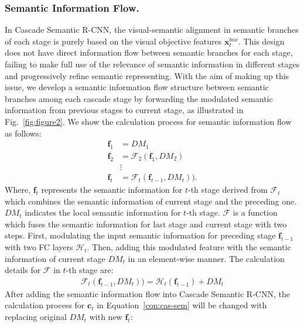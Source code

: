 \documentclass[runningheads]{llncs}
\begin{document}
\subsubsection{Semantic Information Flow.}
In Cascade Semantic R-CNN, the visual-semantic alignment in semantic branches of each stage is purely based on the visual objective features $\mathbf{x}_{t}^{box}$. This design does not have direct information flow between semantic branches for each stage, failing to make full use of the relevance of semantic information in different stages and progressively refine semantic representing. With the aim of making up this issue, we develop a semantic information flow structure between semantic branches among each cascade stage by forwarding the modulated semantic information from previous stages to current stage, as illustrated in Fig.~\ref{fig:figure2}. We show the calculation process for semantic information flow as follows:
\begin{equation}
\begin{split}
    \mathbf{f}_{1} &= DM_{1} \\
    \mathbf{f}_{2} &= \mathcal{F}_{2}(\mathbf{f}_{1}, DM_{2}) \\
    &\vdots \\
    \mathbf{f}_{t} &= \mathcal{F}_{t}(\mathbf{f}_{t-1}, DM_{t})).
\end{split}
\end{equation}
 Where, $\mathbf{f}_{t}$ represents the semantic information for $t$-th stage derived from $\mathcal{F}_{t}$ which combines the semantic information of current stage and the preceding one. $DM_{t}$ indicates the local semantic information for $t$-th stage.  $\mathcal{F}$ is a function which fuses the semantic information for last stage and current stage with two steps. First, modulating the input semantic information for preceding stage $\mathbf{f}_{t-1}$ with two FC layers $\mathcal{H}_{t}$. Then, adding this modulated feature with the semantic information of current stage $DM_{t}$ in an element-wise manner. The calculation details for $\mathcal{F}$ in $t$-th stage are:
\begin{equation}
\begin{split}
    \mathcal{F}_{t}(\mathbf{f}_{t-1}, DM_{t})) = \mathcal{H}_{t}(\mathbf{f}_{t-1}) + DM_{t}
\end{split}
\end{equation}
After adding the semantic information flow into Cascade Semantic R-CNN, the calculation process for $\mathbf{c}_{t}$ in Equation~\ref{con:cas-sem} will be changed with replacing original $DM_{t}$ with new $\mathbf{f}_{t}$:
\end{document}
